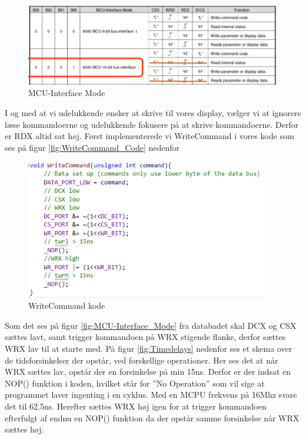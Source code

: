 \begin{figure}[H]
	\centering
	\includegraphics[width = 400pt]{Img/MCU-Interface_Mode.png}
	\caption{MCU-Interface Mode}
	\label{fig:MCU-Interface_Mode}
\end{figure}

I og med at vi udelukkende ønsker at skrive til vores display, vælger vi at ignorere læse kommandoerne og udelukkende fokusere på at skrive kommandoerne. Derfor er RDX altid sat høj.
Først implementerede vi WriteCommand i vores kode som ses på figur \autoref{fig:WriteCommand_Code} nedenfor

\begin{figure}[H]
	\centering
	\includegraphics[width = 300pt]{Img/WriteCommand_Code.png}
	\caption{WriteCommand kode}
	\label{fig:WriteCommand_Code}
\end{figure}


Som det ses på figur \autoref{fig:MCU-Interface_Mode} fra databadet skal DCX og CSX sættes lavt, samt trigger kommandoen på WRX stigende flanke, derfor sættes WRX lav til at starte med. På figur \autoref{fig:Timedelays} nedenfor ses et skema over de tidsforsinkelser der opstår, ved forskellige operationer. Her ses det at når WRX sættes lav, opstår der en forsinkelse på min 15ns. Derfor er der indsat en NOP() funktion i koden, hvilket står for ”No Operation” som vil sige at programmet laver ingenting i en cyklus. Med en MCPU frekvens på 16Mhz svare det til 62,5ns. Herefter sættes WRX høj igen for at trigger kommandoen efterfulgt af endnu en NOP() funktion da der opstår samme forsinkelse når WRX sættes høj.

